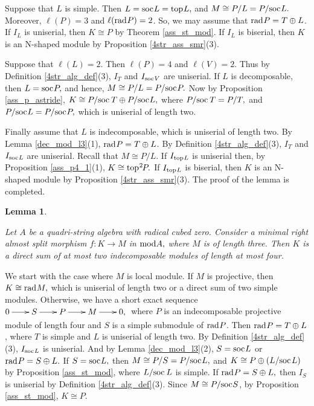 \documentclass[10pt]{amsart}
\newtheorem{Lemma}[Theo]{Lemma}
\theoremstyle{definition}
\newcommand{\mmod}{{\rm mod}}
\newcommand{\rad}{{\rm rad}\hspace{.5pt}}
\newcommand{\soc}{{\rm soc}\hspace{.5pt}}
\newcommand{\ntop}{{\rm top}\hspace{.5pt}}
\newcommand{\hp}{\hspace{.5pt}}
\begin{document}
Suppose that $L$ is simple. Then $L=\soc L=\ntop L,$ and $M\cong P/L=P/\soc L.$ Moreover, $\ell(P)=3$ and $\ell(\rad P)=2$. So, we may assume that $\rad P=T\oplus L$. If $I_L$ is uniserial, then $K\cong P$ by Theorem \ref{ass_st_mod}. If $I_L$ is biserial, then $K$ is an N-shaped module by Proposition \ref{4str_ass_smr}(3). 

Suppose that $\ell(L)=2.$ Then $\ell(P)=4$ and $\ell(V)=2.$ %
Thus by Definition \ref{4str_alg_def}(3), $I_T$ and $I_{\soc V}$ are uniserial. If $L$ is decomposable, then $L=\soc P,$ and hence, $M\cong P/L= P/\soc P.$ Now by Proposition \ref{ass_p_astride}, $K\cong P/\soc\, T \oplus P/\soc L,$ where $P/\soc\, T=P/T,$ and $P/\soc L=P/\soc P,$ which is uniserial of length two.

Finally assume that $L$ is indecomposable, which is uniserial of length two. By Lemma \ref{dec_mod_l3}(1), $\rad P=T\oplus L$. By Definition \ref{4str_alg_def}(3), $I_T$ and $I_{\soc L}$ are uniserial. Recall that $M\cong P/L.$
If $I_{\ntop L}$ is uniserial then, by Proposition \ref{ass_p4_1}(1), $K\cong \ntop^2\hspace{-1pt} P.$ If $I_{\ntop L}$ is biserial, then $K$ is an N-shaped module by Proposition \ref{4str_ass_smr}(3). The proof of the lemma is completed.


\vspace{2.5pt}

\begin{Lemma}\label{4sa_rasm_l3}

Let $A$ be a quadri-string algebra with radical cubed zero. Consider a minimal right almost split morphism $f: K\to M$ in $\mmod A,$ where $M$ is of length three. Then $K$ is a direct sum of at most two indecomposable modules of length at most four.

\end{Lemma}

 We start with the case where $M$ is local module. If $M$ is projective, then $K\cong \rad M,$ which is uniserial of length two or a direct sum of two simple modules. Otherwise, we have a short exact sequence 
$\xymatrixcolsep{20pt}\xymatrix{\hspace{-3pt} 0\ar[r] & S\ar[r] & P \ar[r] & M\ar[r] & 0,}\vspace{-.5pt}$ where $P$ is an indecomposable projective module of length four and $S$ is a simple sub\-module of $\rad P$. Then $\rad P=T\oplus L$, where $T$ is simple and $L$ is uniserial of length two. By Definition \ref{4str_alg_def}(3), $I_{\soc L}$ is uniserial. And by Lemma \ref{dec_mod_l3}(2), $S=\soc L$ or $\rad P=S\oplus L.$ If $S=\soc L,$ then $M\cong P/S= P/\soc L,$ and $K\cong  P\oplus (L/\soc\hp L)$ by Proposition \ref{ass_st_mod}, where $L/\soc \,L$ is simple. If $\rad P=S\oplus L,$ then $I_S$ is uniserial by Definition \ref{4str_alg_def}(3). Since $M\cong P/\soc S$, by Proposition \ref{ass_st_mod}, $K\cong P.$
\end{document}
